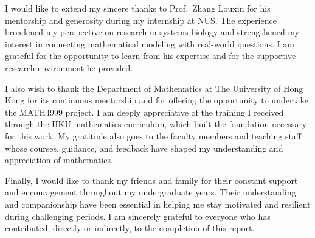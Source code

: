 \documentclass[12pt, a4paper]{report}
\begin{document}
I would like to extend my sincere thanks to Prof.\ Zhang Louxin for his mentorship and generosity during my internship at NUS. The experience broadened my perspective on research in systems biology and strengthened my interest in connecting mathematical modeling with real-world questions. I am grateful for the opportunity to learn from his expertise and for the supportive research environment he provided.

I also wish to thank the Department of Mathematics at The University of Hong Kong for its continuous mentorship and for offering the opportunity to undertake the MATH4999 project. I am deeply appreciative of the training I received through the HKU mathematics curriculum, which built the foundation necessary for this work. My gratitude also goes to the faculty members and teaching staff whose courses, guidance, and feedback have shaped my understanding and appreciation of mathematics.

Finally, I would like to thank my friends and family for their constant support and encouragement throughout my undergraduate years. Their understanding and companionship have been essential in helping me stay motivated and resilient during challenging periods. I am sincerely grateful to everyone who has contributed, directly or indirectly, to the completion of this report.

	

	


	
\end{document}
